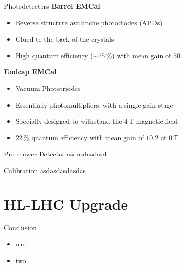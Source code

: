 \documentclass[10pt]{beamer}
\begin{document}
\begin{frame}{Photodetectors}
    \textbf{Barrel EMCal}
    \begin{itemize}
        \item Reverse structure avalanche photodiodes (APDs)
        \item Glued to the back of the crystals
        \item High quantum efficiency ($\sim 75$\,\%) with mean gain of $50$
    \end{itemize}{}
    
    \textbf{Endcap EMCal}
    \begin{itemize}
        \item Vacuum Phototriodes
        \item Essentially photomultipliers, with a single gain stage
        \item Specially designed to withstand the $4$\,T magnetic field
        \item $22$\,\% quantum efficiency with mean gain of $10.2$ at $0$\,T
    \end{itemize}
\end{frame}

\begin{frame}{Pre-shower Detector}
        asdasdasdasd
\end{frame}

\begin{frame}{Calibration}
        asdasdasdasdas
\end{frame}


\section{HL-LHC Upgrade}


\begin{frame}{Conclusion}
    \begin{itemize}
        \item one
        \item two
    \end{itemize}
\end{frame}
 
\end{document}
